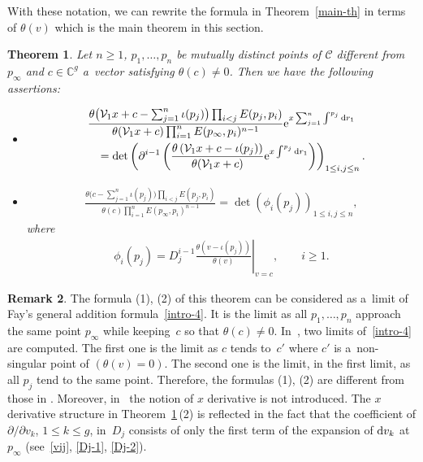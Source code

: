 \documentclass[pdftex]{sigma}
\numberwithin{equation}{section}
\newtheorem{Theorem}{Theorem}[section]
\theoremstyle{definition}
\newtheorem{Remark}[Theorem]{Remark}
\begin{document}
With these notation, we can rewrite the formula in Theorem~\ref{main-th}
 in terms of $\theta(v)$ which is the main theorem in this section.

\begin{Theorem}\label{addition-th}
Let $n\geq 1$, $p_1,\dots ,p_n$ be mutually distinct points of ${\mathcal C}$ different
from $p_\infty$ and $c\in {\mathbb C}^g$ a~vector satisfying $\theta(c)\neq0$. Then we have the following assertions:
\begin{itemize}\itemsep=0pt
\item[$(1)$]
\begin{gather*}
\frac{\theta\bigl({\mathcal V}_1x+c-\sum_{j=1}^n \iota(p_j)\bigr)\prod_{i<j}E(p_j,p_i)}
{\theta({\mathcal V}_1x+c)\prod_{i=1}^n E(p_\infty,p_i)^{n-1}}
{\rm e}^{x\sum_{j=1}^n\int^{p_j}{\rm d}r_1}\\
\qquad
=\det\left(\partial^{i-1}\left(
\frac{\theta\left({\mathcal V}_1x+c-\iota(p_j)\right)}{\theta({\mathcal V}_1x+c)}
{\rm e}^{x\int^{p_j}{\rm d}r_1}\right)\right)_{1\leq i,j\leq n}.
\end{gather*}


\item[$(2)$]
\begin{gather*}
\frac{\theta\bigl(c-\sum_{j=1}^n \iota(p_j)\bigr)\prod_{i<j}E(p_j,p_i)}
{\theta(c)\prod_{i=1}^n E(p_\infty,p_i)^{n-1}}=
\det\left(
\phi_i(p_j)
\right)_{1\leq i,j\leq n},
\end{gather*}
where
\begin{gather*}
\phi_i(p_j)=\left.D_j^{i-1}\frac{\theta\left(v-\iota(p_j)\right)}{\theta(v)}\right|_{v=c},
\qquad
i\geq 1.
\end{gather*}
\end{itemize}
\end{Theorem}

\begin{Remark}
The formula (1), (2) of this theorem
can be considered as a~limit of
Fay's general addition formula~\eqref{intro-4}.
It is the limit as all $p_1,\dots ,p_n$ approach the same point $p_\infty$ while
keeping~$c$ so that $\theta(c)\neq 0$.
In~\cite{Fay1973}, two limits of~\eqref{intro-4} are computed.
The first one is the limit as $c$ tends to~$c'$ where $c'$ is a~non-singular point of
$(\theta(v)=0)$.
The second one is the limit, in the first limit, as all $p_j$ tend to the same point.
Therefore, the formulas (1), (2) are different from those in \cite[Corollary~2.19]{Fay1973}.
 Moreover, in~\cite{Fay1973} the notion of $x$ derivative is not introduced.
 The $x$ derivative structure in Theorem~\ref{addition-th}\,(2) is reflected in the fact
 that the coefficient of $\partial/\partial v_k$, $1\leq k\leq g$, in~$D_j$ consists of
 only the first term of the expansion of ${\rm d}v_k$ at $p_\infty$ (see~\eqref{vij}, \eqref{Dj-1}, \eqref{Dj-2}).
 \end{Remark}
\end{document}
